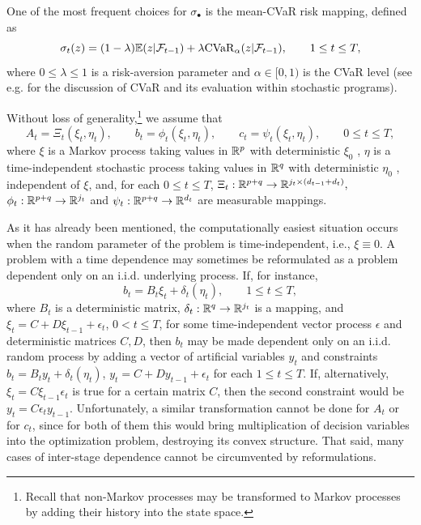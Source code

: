 \documentclass{article}              %
\begin{document}
One of the most frequent choices for $\sigma_{\bullet}$ is the
mean-CVaR risk mapping, defined as 
\[
\sigma_{t}(z)=(1-\lambda)\mathbb{E}(z|\mathcal{F}_{t-1})+\lambda \mathrm{CVaR}_{\alpha}(z|\mathcal{F}_{t-1}),\qquad1\leq t\leq T,
\]
where $0\leq\lambda\leq1$ is a risk-aversion parameter and $\alpha \in [0,1)$
is the CVaR level (see e.g. \cite{rockafellar2002conditional} for
the discussion of CVaR and its evaluation within stochastic programs).

Without loss of generality,\footnote{Recall that non-Markov processes may be transformed to Markov processes by adding their history into the state space.} we assume that
\begin{equation}
A_{t}=\Xi_{t}(\xi_{t},\eta_{t}),\qquad b_{t}=\phi_{t}(\xi_{t},\eta_{t}),\qquad c_{t}=\psi_{t}(\xi_{t},\eta_{t}),\qquad0\leq t\leq T,\label{eq:exi}
\end{equation}
where $\xi$ is a Markov process taking values in $\mathbb{R}^{p}$ with deterministic 
$\xi_{0}$ , $\eta$ is a time-independent stochastic
process taking values in $\mathbb{R}^{q}$ with deterministic $\eta_{0}$ ,
independent of $\xi$, and, for each $0\leq t\leq T$, $\Xi_{t}:\mathbb{R}^{p+q}\rightarrow\mathbb{R}^{j_{t}\times (d_{t-1}+d_{t}) },$
 $\phi_{t}:\mathbb{R}^{p+q}\rightarrow\mathbb{R}^{j_{t}}$ and $\psi_{t}:\mathbb{R}^{p+q}\rightarrow\mathbb{R}^{d_{t}}$
are measurable mappings.

As it has already been mentioned, the computationally easiest situation occurs when the random parameter
of the problem is time-independent, i.e., $\xi\equiv0$. A problem with a time dependence may sometimes be reformulated as a problem dependent
only on an i.i.d. underlying process. If, for instance, 
\begin{equation}
b_{t}=B_{t}\xi_{t}+\delta_{t}(\eta_{t}),\qquad1\leq t\leq T,\label{eq:bbd}
\end{equation}
where $B_{t}$ is a deterministic matrix, $\delta_{t}:\mathbb{R}^q \rightarrow \mathbb{R}^{j_t}$ is a mapping,
and $\xi_{t}=C+D\xi_{t-1}+\epsilon_{t}$, $0<t\leq T$, for some time-independent
vector process $\epsilon$ and deterministic matrices $C,D$, then
$b_{t}$ may be made dependent only on an i.i.d. random process by
adding a vector of artificial variables $y_{t}$ and constraints
$b_{t}=B_{t}y_{t}+\delta_{t}(\eta_{t})$, $y_{t}=C+Dy_{t-1}+\epsilon_{t}$
for each $1\leq t\leq T$. If, alternatively, $\xi_{t}=C\xi_{t-1}\epsilon_{t}$
is true for a certain matrix $C$, then the second constraint would be $y_{t}=C\epsilon_{t}y_{t-1}$.
Unfortunately, a similar transformation cannot be done for $A_{t}$ or
for $c_{t}$, since for both of them this would bring multiplication
of decision variables into the optimization problem, destroying its convex structure. That said, many cases of inter-stage dependence cannot be circumvented by reformulations.
\end{document}
